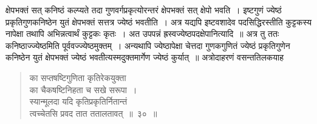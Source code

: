 \documentclass[11pt, openany]{book}
\begin{document}
क्षेपभक्तं सत् कनिष्ठं कल्प्यते तदा गुणवर्गप्रकृत्योरन्तरं क्षेपभक्तं सत् 
क्षेपो भवति~। इष्टगुणं ज्येष्ठं प्रकृतिगुणकनिष्ठेन युतं क्षेपभक्तं सत्तत्र ज्येष्ठं 
भवतीति~। अत्र यद्यपि इष्टवशादेव पदसिद्धिरस्तीति कुट्टकस्य नापेक्षा 
तथापि अभिन्नत्वार्थं कुट्टकः कृतः~। अत उपपन्नं ह्रस्वज्येष्ठपदक्षेपानित्यादि~॥ अत्र तु ततः कनिष्ठाज्ज्येष्ठमिति पूर्ववज्ज्येष्ठमुक्तम्~। अन्यथापि ज्येष्ठापेक्षा चेत्तदा गुणकगुणितं ज्येष्ठं प्रकृतिगुणेन कनिष्ठेन युतं क्षेपभक्तं ज्येष्ठं भवतीत्यस्मदुक्तमार्गेण ज्येष्ठं कुर्यात्~॥
\newpage
 अत्रोदाहरणं वसन्ततिलकयाह\textendash
\begin{quote}
    \ex
     का सप्तषष्टिगुणिता कृतिरेकयुक्ता \\

\vspace{-7mm}
\hspace{1cm} का चैकषष्टिनिहता च सखे सरूपा~। \\

\vspace{-7mm}
 स्यान्मूलदा यदि कृतिप्रकृतिर्नितान्तं \\

\vspace{-7mm}
\hspace{1cm} त्वच्चेतसि प्रवद तात ततालतावत्~॥~३०~॥
\end{quote}
\end{document}
